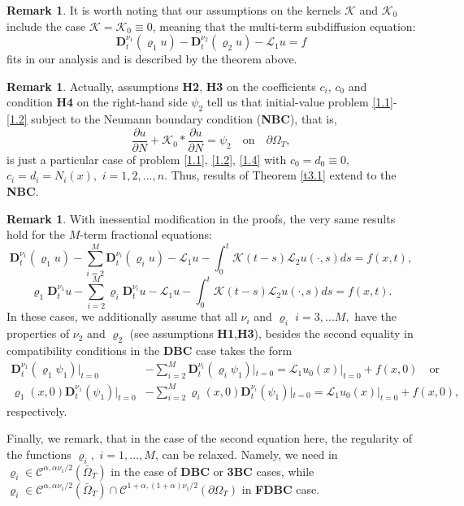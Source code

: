 \documentclass[reqno]{amsart}
\def\C {\mathcal{C}}
\theoremstyle{definition}
\newtheorem{remark}[proposition]{Remark}
\numberwithin{equation}{section}
\begin{document}
\begin{remark}\label{r3.3}
It is worth noting that our assumptions on the kernels $\mathcal{K}$ and  $\mathcal{K}_{0}$
include the case $\mathcal{K}=\mathcal{K}_{0}\equiv 0$, meaning that the multi-term subdiffusion equation:
\[
\mathbf{D}_{t}^{\nu_{1}}(\varrho_{1}u)-\mathbf{D}_{t}^{\nu_2}(\varrho_2 u)-\mathcal{L}_{1}u=f
\]
 fits in our analysis and is described by the theorem above.
\end{remark}

\begin{remark}\label{r3.0}
Actually, assumptions \textbf{H2}, \textbf{H3} on the coefficients $c_i$, $c_0$ and condition \textbf{H4} on the right-hand side $\psi_{2}$ tell us that initial-value problem \eqref{1.1}-\eqref{1.2} subject to the Neumann boundary condition (\textbf{NBC}), that is,
\[
\frac{\partial u}{\partial N}+\mathcal{K}_{0}*\frac{\partial u}{\partial N}=\psi_{2}\quad\text{on}\quad \partial\Omega_{T},
\]
is just a particular case of problem \eqref{1.1}, \eqref{1.2}, \eqref{1.4} with $c_0=d_0\equiv 0,$ $c_{i}=d_{i}=N_{i}(x),$ $i=1,2,...,n$.
Thus, results of Theorem \ref{t3.1} extend to the \textbf{NBC}.
\end{remark}

\begin{remark}\label{r3.4}
With inessential modification in the proofs, the very same results hold for the $M$-term fractional equations:
$$\mathbf{D}_{t}^{\nu_{1}}(\varrho_{1}u)-\sum_{i=2}^{M}\mathbf{D}_{t}^{\nu_i}(\varrho_{i} u)-\mathcal{L}_{1}u-\int_{0}^{t}\mathcal{K}(t-s)\mathcal{L}_{2}u(\cdot,s)ds=f(x,t),$$
$$\varrho_{1}\mathbf{D}_{t}^{\nu_{1}} u-\sum_{i=2}^{M}\varrho_{i}\mathbf{D}_{t}^{\nu_i} u-\mathcal{L}_{1}u-\int_{0}^{t}\mathcal{K}(t-s)\mathcal{L}_{2}u(\cdot,s)ds=f(x,t).$$
In these cases, we additionally assume that all $\nu_i$  and $
\varrho_{i}$ $i=3,...M,$ have the properties of $\nu_2$ and $\varrho_{2}$ (see assumptions \textbf{H1},\textbf{H3}), besides the second equality in compatibility conditions in the \textbf{DBC} case takes the form
\begin{align*}
\mathbf{D}_{t}^{\nu_{1}}(\varrho_1\psi_1)|_{t=0}&-\sum_{i=2}^{M}\mathbf{D}_{t}^{\nu_i}(\varrho_i\psi_1)|_{t=0}=\mathcal{L}_{1}u_{0}(x)|_{t=0}+f(x,0)\quad\text{or}
\\
\varrho_1(x,0)\mathbf{D}_{t}^{\nu_{1}}(\psi_1)|_{t=0}&-\sum_{i=2}^{M}\varrho_i(x,0)\mathbf{D}_{t}^{\nu_i}(\psi_1)|_{t=0}=\mathcal{L}_{1}u_{0}(x)|_{t=0}+f(x,0),
\end{align*}
 respectively.

Finally, we remark, that in the case of the second equation here, the regularity of the functions $\varrho_{i},$ $i=1,...,M$, can be relaxed. Namely, we need in $\varrho_{i}\in\C^{\alpha,\alpha\nu_1/2}(\bar{\Omega}_{T})$ in the case of \textbf{DBC} or \textbf{3BC} cases, while $\varrho_{i}\in\C^{\alpha,\alpha\nu_1/2}(\bar{\Omega}_{T})\cap\C^{1+\alpha,(1+\alpha)\nu_1/2}(\partial\Omega_{T})$ in \textbf{FDBC} case.
\end{remark}
\end{document}

